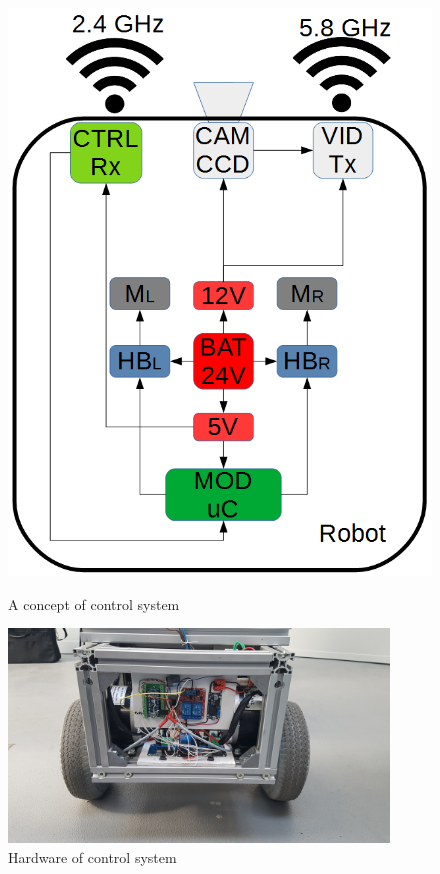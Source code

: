 \documentclass[3p,times,12pt]{elsarticle}
\begin{document}
\begin{figure}[ht!]
\centering
\begin{minipage}[c]{0.48\textwidth}
\centering
\includegraphics[width=0.9 \textwidth]{Robot_Control.png}
\caption{A concept of control system}
\label{fig:Robot_Control}
\end{minipage}
\hfill
\begin{minipage}[c]{0.48\textwidth}
\centering
\includegraphics[width=0.9\textwidth]{front.jpg}
\caption{Hardware of control system}
\label{fig:front}
\end{minipage}
\end{figure}
\end{document}
